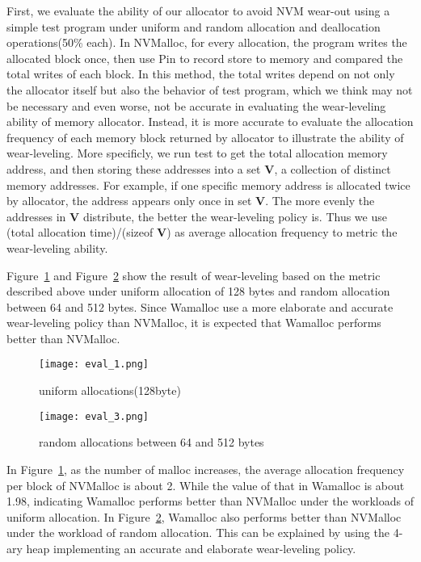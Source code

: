 \documentclass{vldb}
\begin{document}
First, we evaluate the ability of our allocator to avoid NVM wear-out using a simple test program under uniform and random allocation and deallocation operations(50\% each).
In NVMalloc, for every allocation, the program writes the allocated block once, then use Pin\cite{luk2005pin} to record store to memory and compared the total writes of each block.
In this method, the total writes depend on not only the allocator itself but also the behavior of test program,
which we think may not be necessary and even worse, not be accurate in evaluating the wear-leveling ability of memory allocator.
Instead, it is more accurate to evaluate the allocation frequency of each memory block returned by allocator to illustrate the ability of wear-leveling.
More specificly, we run test to get the total allocation memory address, and then storing these addresses into a set \textbf{V},
a collection of distinct memory addresses.
For example, if one specific memory address is allocated twice by allocator, the address appears only once in set \textbf{V}.
The more evenly the addresses in \textbf{V} distribute, the better the wear-leveling policy is.
Thus we use (total allocation time)/(sizeof \textbf{V}) as average allocation frequency to metric the wear-leveling ability.

Figure~\ref{fig:eval_1} and Figure~\ref{fig:eval_3} show the result of wear-leveling based on the metric described above
under uniform allocation of 128 bytes and random allocation between 64 and 512 bytes.
Since Wamalloc use a more elaborate and accurate wear-leveling policy than NVMalloc,
it is expected that Wamalloc performs better than NVMalloc.

\begin{figure}[ht]
\centering
\texttt{[image: eval\_1.png]}
\caption{uniform allocations(128byte)}
\label{fig:eval_1}
\end{figure}

\begin{figure}[ht]
\centering
\texttt{[image: eval\_3.png]}
\caption{random allocations between 64 and 512 bytes}
\label{fig:eval_3}
\end{figure}

In Figure~\ref{fig:eval_1}, as the number of malloc increases,
the average allocation frequency per block of NVMalloc is about 2.
While the value of that in Wamalloc is about 1.98, 
indicating Wamalloc performs better than NVMalloc under the workloads of uniform allocation.
In Figure~\ref{fig:eval_3},
Wamalloc also performs better than NVMalloc under the workload of random allocation.
This can be explained by using the 4-ary heap implementing an accurate and elaborate wear-leveling policy.
\end{document}

